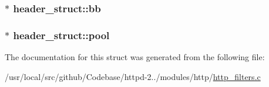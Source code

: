 \subsubsection[{\texorpdfstring{bb}{bb}}]{$\ast$ header\+\_\+struct\+::bb}\hypertarget{structheader__struct_a00e057ecfd8743af3d991d1f2e1a3d11}{}\label{structheader__struct_a00e057ecfd8743af3d991d1f2e1a3d11}
\subsubsection[{\texorpdfstring{pool}{pool}}]{$\ast$ header\+\_\+struct\+::pool}\hypertarget{structheader__struct_a2c74583f4c50090dee7deb9532ebc7ae}{}\label{structheader__struct_a2c74583f4c50090dee7deb9532ebc7ae}


The documentation for this struct was generated from the following file\+:\begin{DoxyCompactItemize}
\item 
/usr/local/src/github/\+Codebase/httpd-\/2../modules/http/\hyperlink{http__filters_8c}{http\+\_\+filters.\+c}\end{DoxyCompactItemize}
